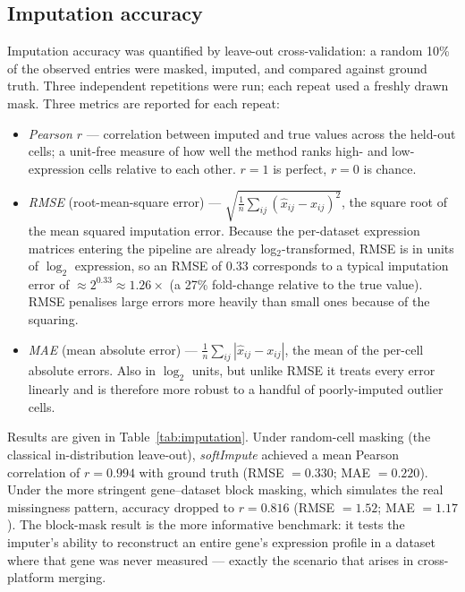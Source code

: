 \documentclass[11pt,a4paper]{article}
\begin{document}
\subsection{Imputation accuracy}
\label{sec:imputation}

Imputation accuracy was quantified by leave-out cross-validation:
a random 10\% of the observed entries were masked, imputed, and
compared against ground truth. Three independent repetitions
were run; each repeat used a freshly drawn mask. Three metrics are
reported for each repeat:
\begin{itemize}
  \item \emph{Pearson $r$} --- correlation between imputed and
    true values across the held-out cells; a unit-free measure
    of how well the method ranks high- and low-expression cells
    relative to each other. $r = 1$ is perfect, $r = 0$ is
    chance.
  \item \emph{RMSE} (root-mean-square error) ---
    $\sqrt{\frac{1}{n}\sum_{ij}(\hat x_{ij} - x_{ij})^2}$, the
    square root of the mean squared imputation error. Because
    the per-dataset expression matrices entering the pipeline
    are already log$_2$-transformed, RMSE is in units of
    $\log_2$ expression, so an RMSE of $0.33$ corresponds to a
    typical imputation error of $\approx 2^{0.33}\!\approx\!1.26\times$
    (a 27\% fold-change relative to the true value). RMSE
    penalises large errors more heavily than small ones because
    of the squaring.
  \item \emph{MAE} (mean absolute error) ---
    $\frac{1}{n}\sum_{ij}|\hat x_{ij} - x_{ij}|$, the mean of
    the per-cell absolute errors. Also in $\log_2$ units, but
    unlike RMSE it treats every error linearly and is therefore
    more robust to a handful of poorly-imputed outlier cells.
\end{itemize}
Results are given in Table~\ref{tab:imputation}.
Under random-cell masking (the classical in-distribution
leave-out), \textit{softImpute} achieved a mean Pearson
correlation of $r = 0.994$ with ground truth (RMSE $= 0.330$;
MAE $= 0.220$). Under the more stringent gene--dataset block
masking, which simulates the real missingness pattern, accuracy
dropped to $r = 0.816$ (RMSE $= 1.52$; MAE $= 1.17$). The
block-mask result is the more informative benchmark: it tests
the imputer's ability to reconstruct an entire gene's expression
profile in a dataset where that gene was never measured ---
exactly the scenario that arises in cross-platform merging.
\end{document}
